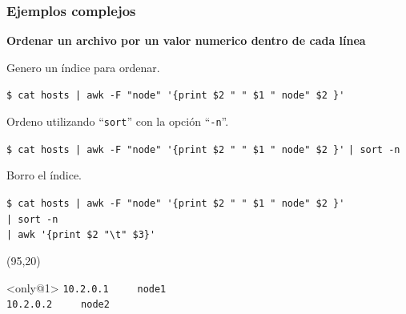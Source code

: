 \documentclass{beamer}
\begin{document}
\begin{frame}[fragile,t]
    \frametitle{\small Ejemplos complejos}
    \textbf{Ordenar un archivo por un valor numerico dentro de cada línea}\\
    \begin{minipage}{0.75\textwidth}
    \vspace{0.6cm}
    \small \pause
    Genero un índice para ordenar.
    \vspace{-0.3cm} \scriptsize
    \begin{block}{\vspace*{-3ex}}
    \texttt{\$}\verb; cat hosts | awk -F "node" '{print $2 " " $1 " node" $2 }';
    \vspace*{0.5ex}
    \end{block}
    \vspace{0.4cm}
    \small \pause
    Ordeno utilizando ``\verb|sort|'' con la opci\'on ``\verb|-n|''.
    \vspace{-0.3cm} \scriptsize
    \begin{block}{\vspace*{-3ex}}
    \texttt{\$}\verb; cat hosts | awk -F "node" '{print $2 " " $1 " node" $2 }';
    \hspace*{1.61cm} \verb;| sort -n;
    \vspace*{0.5ex}
    \end{block}
    \vspace{0.4cm}
    \small \pause
    Borro el índice.
    \vspace{-0.3cm} \scriptsize
    \begin{block}{\vspace*{-3ex}}
    \texttt{\$}\verb; cat hosts | awk -F "node" '{print $2 " " $1 " node" $2 }';\\
    \hspace*{1.61cm} \verb;| sort -n ;\\
    \hspace*{1.61cm} \verb;| awk '{print $2 "\t" $3}';
    \vspace*{0.5ex}
    \end{block}
    \end{minipage}
    \begin{textblock}{28}(95,20)
     \vspace{-0.5cm}
    \begin{block}<only@1>{\vspace*{-3ex}}
    \scriptsize
    \verb;10.2.0.1     node1 ;\\
    \verb;10.2.0.2     node2 ;\\

\end{block}
\end{textblock}
\end{frame}
\end{document}
